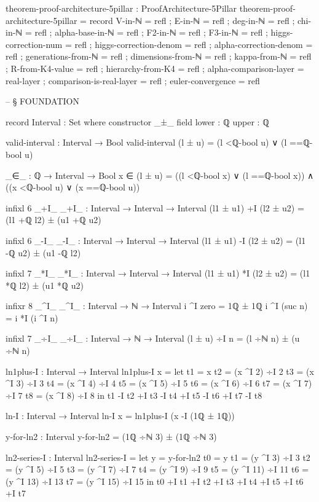 \documentclass[11pt,a4paper]{book}
\begin{document}
\begin{code}
theorem-proof-architecture-5pillar : ProofArchitecture-5Pillar
theorem-proof-architecture-5pillar = record
  { V-in-ℕ   = refl
  ; E-in-ℕ   = refl
  ; deg-in-ℕ = refl
  ; chi-in-ℕ = refl
  ; alpha-base-in-ℕ = refl
  ; F2-in-ℕ  = refl
  ; F3-in-ℕ  = refl
  ; higgs-correction-num   = refl
  ; higgs-correction-denom = refl
  ; alpha-correction-denom = refl
  ; generations-from-ℕ     = refl
  ; dimensions-from-ℕ      = refl
  ; kappa-from-ℕ           = refl
  ; R-from-K4-value        = refl
  ; hierarchy-from-K4      = refl
  ; alpha-comparison-layer   = real-layer
  ; comparison-is-real-layer = refl
  ; euler-convergence = refl
  }


-- § FOUNDATION

record Interval : Set where
  constructor _±_
  field
    lower : ℚ
    upper : ℚ

valid-interval : Interval → Bool
valid-interval (l ± u) = (l <ℚ-bool u) ∨ (l ==ℚ-bool u)

_∈_ : ℚ → Interval → Bool
x ∈ (l ± u) = ((l <ℚ-bool x) ∨ (l ==ℚ-bool x)) ∧ ((x <ℚ-bool u) ∨ (x ==ℚ-bool u))

infixl 6 _+I_
_+I_ : Interval → Interval → Interval
(l1 ± u1) +I (l2 ± u2) = (l1 +ℚ l2) ± (u1 +ℚ u2)

infixl 6 _-I_
_-I_ : Interval → Interval → Interval
(l1 ± u1) -I (l2 ± u2) = (l1 -ℚ u2) ± (u1 -ℚ l2)

infixl 7 _*I_
_*I_ : Interval → Interval → Interval
(l1 ± u1) *I (l2 ± u2) = 
  (l1 *ℚ l2) ± (u1 *ℚ u2)

infixr 8 _^I_
_^I_ : Interval → ℕ → Interval
i ^I zero = 1ℚ ± 1ℚ
i ^I (suc n) = i *I (i ^I n)

infixl 7 _÷I_
_÷I_ : Interval → ℕ → Interval
(l ± u) ÷I n = (l ÷ℕ n) ± (u ÷ℕ n)

ln1plus-I : Interval → Interval
ln1plus-I x = 
  let t1 = x
      t2 = (x ^I 2) ÷I 2
      t3 = (x ^I 3) ÷I 3
      t4 = (x ^I 4) ÷I 4
      t5 = (x ^I 5) ÷I 5
      t6 = (x ^I 6) ÷I 6
      t7 = (x ^I 7) ÷I 7
      t8 = (x ^I 8) ÷I 8
  in t1 -I t2 +I t3 -I t4 +I t5 -I t6 +I t7 -I t8

ln-I : Interval → Interval
ln-I x = ln1plus-I (x -I (1ℚ ± 1ℚ))

y-for-ln2 : Interval
y-for-ln2 = (1ℚ ÷ℕ 3) ± (1ℚ ÷ℕ 3)

ln2-series-I : Interval
ln2-series-I = 
  let y = y-for-ln2
      t0 = y
      t1 = (y ^I 3) ÷I 3
      t2 = (y ^I 5) ÷I 5
      t3 = (y ^I 7) ÷I 7
      t4 = (y ^I 9) ÷I 9
      t5 = (y ^I 11) ÷I 11
      t6 = (y ^I 13) ÷I 13
      t7 = (y ^I 15) ÷I 15
  in t0 +I t1 +I t2 +I t3 +I t4 +I t5 +I t6 +I t7


\end{code}
\end{document}
